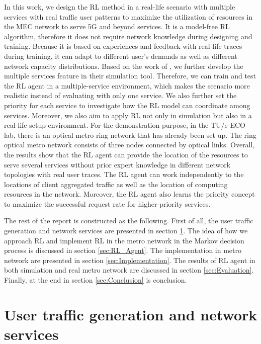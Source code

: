\documentclass[conference]{IEEEtran}
\begin{document}
In this work, we design the RL method in a real-life scenario with multiple services with real traffic user patterns to maximize the utilization of resources in the MEC network to serve 5G and beyond services. It is a model-free RL algorithm, therefore it does not require network knowledge during designing and training. Because it is based on experiences and feedback with real-life traces during training, it can adapt to different user's demands as well as different network capacity distributions. Based on the work of \cite{9269087}, we further develop the multiple services feature in their simulation tool. Therefore, we can train and test the RL agent in a multiple-service environment, which makes the scenario more realistic instead of evaluating with only one service. We also further set the priority for each service to investigate how the RL model can coordinate among services. Moreover, we also aim to apply RL not only in simulation but also in a real-life setup environment. For the demonstration purpose, in the TU/e ECO lab, there is an optical metro ring network that has already been set up. The ring optical metro network consists of three nodes connected by optical links. Overall, the results show that the RL agent can provide the location of the resources to serve several services without prior expert knowledge in different network topologies with real user traces. The RL agent can work independently to the locations of client aggregated traffic as well as the location of computing resources in the network. Moreover, the RL agent also learns the priority concept to maximize the successful request rate for higher-priority services. 

The rest of the report is constructed as the following. First of all, the user traffic generation and network services are presented in section \ref{sec:User traffic generation}. The idea of how we approach RL and implement RL in the metro network in the Markov decision process is discussed in section \ref{sec:RL_Agent}. The implementation in metro network are presented in section \ref{sec:Implementation}. The results of RL agent in both simulation and real metro network are discussed in section \ref{sec:Evaluation}. Finally, at the end in section \ref{sec:Conclusion} is conclusion.


\section{User traffic generation and network services}
\label{sec:User traffic generation}
\end{document}
